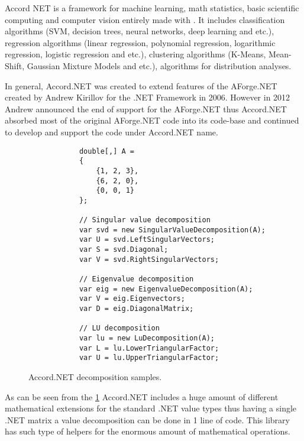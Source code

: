 \documentclass[../../../../main]{subfiles}
\begin{document}
Accord NET is a framework for machine learning, math statistics, basic scientific computing and computer vision entirely made with {\Csharp}. It includes classification algorithms (\ac{SVM}, decision trees, neural networks, deep learning and etc.), regression algorithms (linear regression, polynomial regression, logarithmic regression, logistic regression and etc.), clustering algorithms (K-Means, Mean-Shift, Gaussian Mixture Models and etc.), algorithms for distribution analyses.

In general, Accord.NET was created to extend features of the AForge.NET created by Andrew Kirillov for the .NET Framework in 2006. However in 2012 Andrew announced the end of support for the AForge.NET thus Accord.NET absorbed most of the original AForge.NET code into its code-base and continued to develop and support the code under Accord.NET name.

\begin{figure} [!ht]
  \centering    
    \lstset{style=sharpc}
        \begin{lstlisting}
            double[,] A = 
            {
                {1, 2, 3},
                {6, 2, 0},
                {0, 0, 1}
            };

            // Singular value decomposition
            var svd = new SingularValueDecomposition(A);
            var U = svd.LeftSingularVectors;
            var S = svd.Diagonal;
            var V = svd.RightSingularVectors;

            // Eigenvalue decomposition
            var eig = new EigenvalueDecomposition(A);
            var V = eig.Eigenvectors;
            var D = eig.DiagonalMatrix;

            // LU decomposition
            var lu = new LuDecomposition(A);
            var L = lu.LowerTriangularFactor;
            var U = lu.UpperTriangularFactor;         
        \end{lstlisting}
  \caption{Accord.NET decomposition samples.}
  \label{accordnetdecompose}
\end{figure}

As can be seen from the \ref{accordnetdecompose} Accord.NET includes a huge amount of different mathematical extensions for the standard .NET value types thus having a single .NET matrix a value decomposition can be done in 1 line of code. This library has such type of helpers for the enormous amount of mathematical operations.
\end{document}
